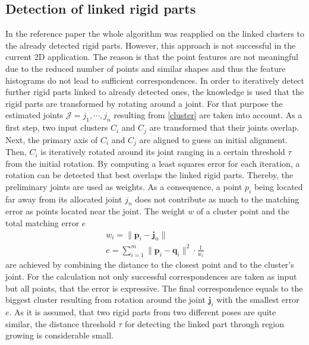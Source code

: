\subsection{Detection of linked rigid parts}
\label{JointWeights}
In the reference paper the whole algorithm was reapplied on the linked clusters to the already detected rigid parts. However, this approach is not successful in the current 2D application. The reason is that the point features are not meaningful due to the reduced number of points and similar shapes and thus the feature histograms do not lead to sufficient correspondences. In order to iteratively detect further rigid parts linked to already detected ones, the knowledge is used that the rigid parts are transformed by rotating around a joint. For that purpose the estimated joints $\mathcal{J} = j_1,\cdots,j_n$ resulting from \ref{cluster} are taken into account. As a first step, two input clusters $C_i$ and $C_j$ are transformed that their joints overlap.  Next, the primary axis of $C_i$ and $C_j$ are aligned to guess an initial alignment. Then, $C_i$ is iteratively rotated around its joint ranging in a certain threshold $\tau$ from the initial rotation. By computing a least squares error for each iteration, a rotation can be detected that best overlaps the linked rigid parts. Thereby, the preliminary joints are used as weights. As a consequence, a point $p_i$ being located far away from its allocated joint $j_n$ does not contribute as much to the matching error as points located near the joint. The weight $w$ of a cluster point and the total matching error $e$
%
\begin{equation}
\begin{split}
w_i = \| \boldsymbol{p}_i - \boldsymbol{j}_n\|
\\
e = \displaystyle\sum_{i=1}^{m}\| \boldsymbol{p}_i - \boldsymbol{q}_i\|^2 \cdot \frac{1}{w_i}
\end{split}
\label{eq:jointWeightError}
\end{equation}
%
are achieved by combining the distance to the closest point and to the cluster's joint. For the calculation not only successful correspondences are taken as input but all points, that the error is expressive. The final correspondence equals to the biggest cluster resulting from rotation around the joint $\boldsymbol{j}_i$ with the smallest error $e$. As it is assumed, that two rigid parts from two different poses are quite similar, the distance threshold $\tau$ for detecting the linked part through region growing is considerable small.

